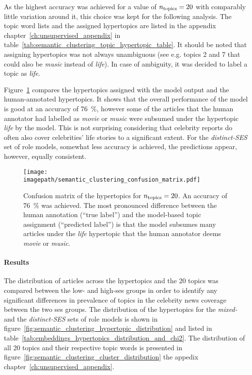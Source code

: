 As the highest accuracy was achieved for a value of $n_\text{topics}=20$ with comparably little variation around it, this choice was kept for the following analysis. The topic word lists and the assigned hypertopics are listed in the appendix chapter~\ref{ch:unsupervised_appendix} in table~\ref{tab:semantic_clustering_topic_hypertopic_table}. It should be noted that assigning hypertopics was not always unambiguous (see e.g. topics 2 and 7 that could also be \textit{music} instead of \textit{life}). In case of ambiguity, it was decided to label a topic as \textit{life}.

Figure~\ref{fig:embedding_confusion_matrix} compares the hypertopics assigned with the model output and the human-annotated hypertopics. It shows that the overall performance of the model is good at an accuracy of \SI{76}{\percent}, however some of the articles that the human annotator had labelled as \textit{movie} or \textit{music} were subsumed under the hypertopic \textit{life} by the model. This is not surprising considering that celebrity reports do often also cover celebrities' life stories to a significant extent. For the \textit{distinct-SES} set of role models, somewhat less accuracy is achieved, the predictions appear, however, equally consistent.

\begin{figure}
    \centering
    \texttt{[image: \\imagepath/semantic\_clustering\_confusion\_matrix.pdf]}
    \caption{Confusion matrix of the hypertopics for $n_\text{topics}=20$. An accuracy of \SI{76}{\percent} was achieved. The most pronounced difference between the human annotation (``true label'') and the model-based topic assignment (``predicted label'') is that the model subsumes many articles under the \textit{life} hypertopic that the human annotator deems \textit{movie} or \textit{music}.}\label{fig:embedding_confusion_matrix}
\end{figure}

\paragraph{Results}
The distribution of articles across the hypertopics and the \SI{20}{} topics was compared between the low- and high-\gls{ses} groups in order to identify any significant differences in prevalence of topics in the celebrity news coverage between the two \gls{ses} groups. The distribution of the hypertopics for the \textit{mixed-} and the \textit{distinct-SES} sets of role models is shown in figure~\ref{fig:semantic_clustering_hypertopic_distribution} and listed in table~\ref{tab:embeddings_hypertopics_distribution_and_chi2}. The distribution of all \SI{20}{} topics and their respective topic words is presented in figure~\ref{fig:semantic_clustering_cluster_distribution} the appedix chapter~\ref{ch:unsupervised_appendix}.

